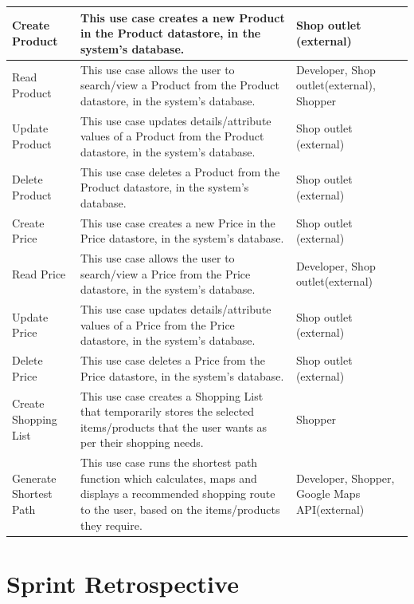 \documentclass[12pt]{article}
\begin{document}
\begin{tabu} to \textwidth{| X[c] | X[c] | X[c] |} \hline
Create Product & This use case creates a new Product in the Product datastore, in the system's database. & Shop outlet (external)\\
\hline
Read Product & This use case allows the user to search/view a Product from the Product datastore, in the system's database. & Developer, Shop outlet(external), Shopper\\
\hline
Update Product & This use case updates details/attribute values of a Product from the Product datastore, in the system's database. & Shop outlet (external)\\
\hline
Delete Product & This use case deletes a Product from the Product datastore, in the system's database. & Shop outlet (external)\\
\hline
Create Price & This use case creates a new Price in the Price datastore, in the system's database. & Shop outlet (external)\\
\hline
Read Price & This use case allows the user to search/view a Price from the Price datastore, in the system's database. & Developer, Shop outlet(external)\\
\hline
Update Price & This use case updates details/attribute values of a Price from the Price datastore, in the system's database. & Shop outlet (external)\\
\hline
Delete Price & This use case deletes a Price from the Price datastore, in the system's database. & Shop outlet (external)\\
\hline
Create Shopping List & This use case creates a Shopping List that temporarily stores the selected items/products that the user wants as per their shopping needs. & Shopper\\
\hline
Generate Shortest Path & This use case runs the shortest path function which calculates, maps and displays a recommended shopping route to the user, based on the items/products they require. & Developer, Shopper, Google Maps API(external)\\
\hline
\end{tabu}

\section{Sprint Retrospective}
\end{document}

